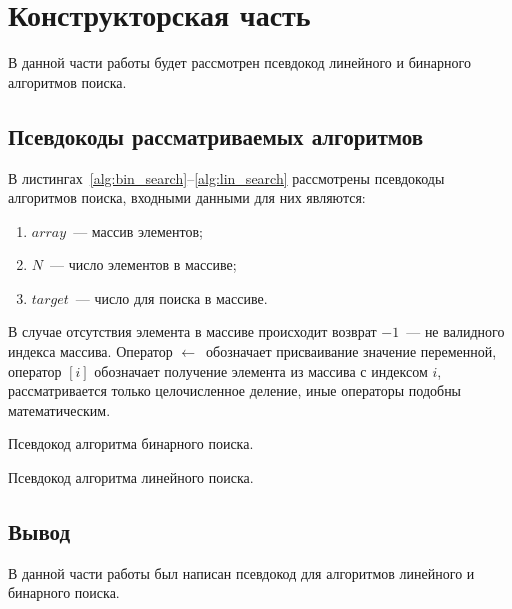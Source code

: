 \chapter{Конструкторская часть}
В данной части работы будет рассмотрен псевдокод линейного и бинарного алгоритмов поиска.





\section{Псевдокоды рассматриваемых алгоритмов}

В листингах~\ref{alg:bin_search}--\ref{alg:lin_search} рассмотрены псевдокоды алгоритмов поиска, входными данными для них являются:
\begin{enumerate}
	\item $array$~--- массив элементов;
	\item $N$~--- число элементов в массиве;
	\item $target$~--- число для поиска в массиве.
\end{enumerate}
В случае отсутствия элемента в массиве происходит возврат $-1$~--- не валидного индекса массива. Оператор $\gets$~обозначает присваивание значение переменной, оператор $[i]$ обозначает получение элемента из массива с индексом $i$, рассматривается только целочисленное деление, иные операторы подобны математическим.
\begin{algorithm}
\caption{Псевдокод алгоритма бинарного поиска.}\label{alg:bin_search}
\begin{algorithmic}
			\State {}
		\EndIf
		\Else
		\EndIf
	\EndWhile
	\State {}
\end{algorithmic}
\end{algorithm}

\begin{algorithm}
\caption{Псевдокод алгоритма линейного поиска.}\label{alg:lin_search}
\begin{algorithmic}
			\State {}
		\EndIf
	\EndFor
	\State {}
\end{algorithmic}
\end{algorithm}










\section*{Вывод}
В данной части работы был написан псевдокод для алгоритмов линейного и бинарного поиска.








